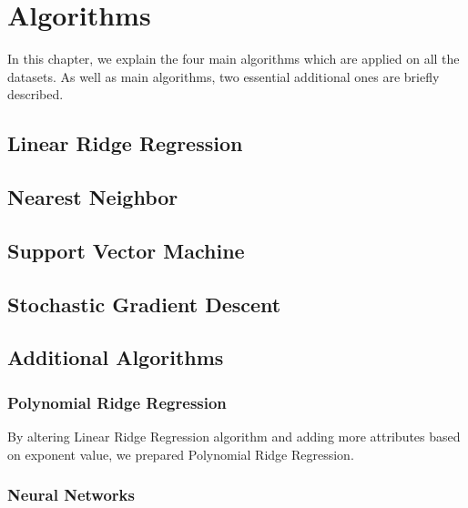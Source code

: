 \section{Algorithms}
In this chapter, we explain the four main algorithms which are applied on all the datasets. As well as main algorithms, two essential additional ones are briefly described.

\subsection{Linear Ridge Regression}
\subsection{Nearest Neighbor}
\subsection{Support Vector Machine}
\subsection{Stochastic Gradient Descent}
\subsection{Additional Algorithms}
\subsubsection{Polynomial Ridge Regression}
By altering Linear Ridge Regression algorithm and adding more attributes based on exponent value, we prepared Polynomial Ridge Regression.
\subsubsection{Neural Networks}

